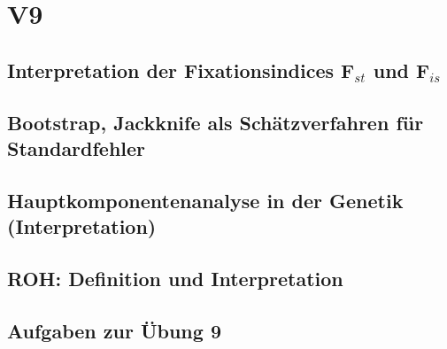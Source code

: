 \section{V9}
\subsection{Interpretation der Fixationsindices F$_{st}$ und F$_{is}$}

\subsection{Bootstrap, Jackknife als Schätzverfahren für Standardfehler}

\subsection{Hauptkomponentenanalyse in der Genetik (Interpretation)}

\subsection{ROH: Definition und Interpretation}

\subsection{Aufgaben zur Übung 9}
